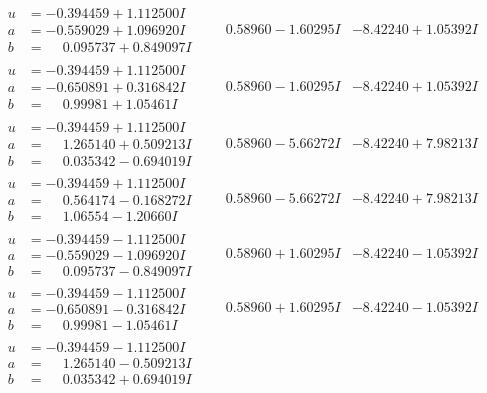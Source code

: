 \documentclass[1p]{elsarticle_modified}
\theoremstyle{definition}
\begin{document}
$$\begin{array}{c|c|c}
\begin{aligned}
u &= -0.394459 + 1.112500 I \\
a &= -0.559029 + 1.096920 I \\
b &= \phantom{-}0.095737 + 0.849097 I\end{aligned}
 & \phantom{-}0.58960 - 1.60295 I & -8.42240 + 1.05392 I \\ \hline\begin{aligned}
u &= -0.394459 + 1.112500 I \\
a &= -0.650891 + 0.316842 I \\
b &= \phantom{-}0.99981 + 1.05461 I\end{aligned}
 & \phantom{-}0.58960 - 1.60295 I & -8.42240 + 1.05392 I \\ \hline\begin{aligned}
u &= -0.394459 + 1.112500 I \\
a &= \phantom{-}1.265140 + 0.509213 I \\
b &= \phantom{-}0.035342 - 0.694019 I\end{aligned}
 & \phantom{-}0.58960 - 5.66272 I & -8.42240 + 7.98213 I \\ \hline\begin{aligned}
u &= -0.394459 + 1.112500 I \\
a &= \phantom{-}0.564174 - 0.168272 I \\
b &= \phantom{-}1.06554 - 1.20660 I\end{aligned}
 & \phantom{-}0.58960 - 5.66272 I & -8.42240 + 7.98213 I \\ \hline\begin{aligned}
u &= -0.394459 - 1.112500 I \\
a &= -0.559029 - 1.096920 I \\
b &= \phantom{-}0.095737 - 0.849097 I\end{aligned}
 & \phantom{-}0.58960 + 1.60295 I & -8.42240 - 1.05392 I \\ \hline\begin{aligned}
u &= -0.394459 - 1.112500 I \\
a &= -0.650891 - 0.316842 I \\
b &= \phantom{-}0.99981 - 1.05461 I\end{aligned}
 & \phantom{-}0.58960 + 1.60295 I & -8.42240 - 1.05392 I \\ \hline\begin{aligned}
u &= -0.394459 - 1.112500 I \\
a &= \phantom{-}1.265140 - 0.509213 I \\
b &= \phantom{-}0.035342 + 0.694019 I\end{aligned}

\end{array}$$
\end{document}
